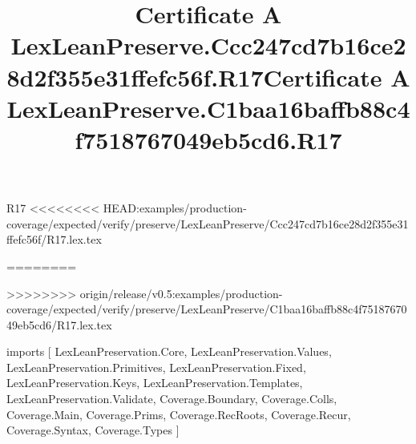 \begin{lexlean}{R17}
<<<<<<<< HEAD:examples/production-coverage/expected/verify/preserve/LexLeanPreserve/Ccc247cd7b16ce28d2f355e31ffefc56f/R17.lex.tex
\title{Certificate A LexLeanPreserve.Ccc247cd7b16ce28d2f355e31ffefc56f.R17}
========
\title{Certificate A LexLeanPreserve.C1baa16baffb88c4f7518767049eb5cd6.R17}
>>>>>>>> origin/release/v0.5:examples/production-coverage/expected/verify/preserve/LexLeanPreserve/C1baa16baffb88c4f7518767049eb5cd6/R17.lex.tex
\begin{coremodule}
imports [
  LexLeanPreservation.Core,
  LexLeanPreservation.Values,
  LexLeanPreservation.Primitives,
  LexLeanPreservation.Fixed,
  LexLeanPreservation.Keys,
  LexLeanPreservation.Templates,
  LexLeanPreservation.Validate,
  Coverage.Boundary,
  Coverage.Colls,
  Coverage.Main,
  Coverage.Prims,
  Coverage.RecRoots,
  Coverage.Recur,
  Coverage.Syntax,
  Coverage.Types
]


\end{coremodule}
\end{lexlean}

